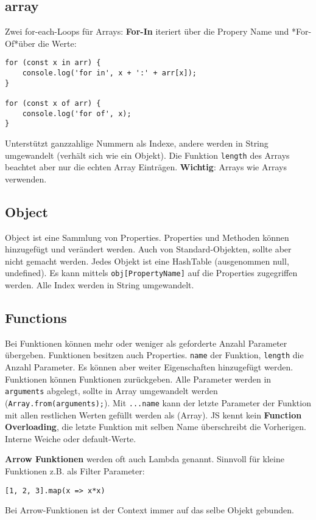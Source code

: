 \documentclass[11pt,twoside,landscape]{article}
\begin{document}
\begin{multicols}{4}
\subsection*{array}
\label{sec:org084a144}
Zwei for-each-Loops für Arrays: \textbf{For-In} iteriert über die Propery Name und *For-Of*über die Werte:
\begin{verbatim}
for (const x in arr) {
    console.log('for in', x + ':' + arr[x]);
}

for (const x of arr) {
    console.log('for of', x);
}
\end{verbatim}
Unterstützt ganzzahlige Nummern als Indexe, andere werden in String umgewandelt (verhält sich wie ein Objekt). Die Funktion \texttt{length} des Arrays beachtet aber nur die echten Array Einträgen. \textbf{Wichtig}: Arrays wie Arrays verwenden.

\subsection*{Object}
\label{sec:orgfeb8180}
Object ist eine Sammlung von Properties. Properties und Methoden können hinzugefügt und verändert werden. Auch von Standard-Objekten, sollte aber nicht gemacht werden. Jedes Objekt ist eine HashTable (ausgenommen null, undefined). Es kann mittels \texttt{obj[PropertyName]} auf die Properties zugegriffen werden. Alle Index werden in String umgewandelt.

\subsection*{Functions}
\label{sec:orgbafc31d}
Bei Funktionen können mehr oder weniger als geforderte Anzahl Parameter übergeben. Funktionen besitzen auch Properties. \texttt{name} der Funktion, \texttt{length} die Anzahl Parameter. Es können aber weiter Eigenschaften hinzugefügt werden. Funktionen können Funktionen zurückgeben. Alle Parameter werden in \texttt{arguments} abgelegt, sollte in Array umgewandelt werden (\texttt{Array.from(arguments);}). Mit \texttt{...name} kann der letzte Parameter der Funktion mit allen restlichen Werten gefüllt werden als (Array).
JS kennt kein \textbf{Function Overloading}, die letzte Funktion mit selben Name überschreibt die Vorherigen. Interne Weiche oder default-Werte.

\textbf{Arrow Funktionen} werden oft auch Lambda genannt. Sinnvoll für kleine Funktionen z.B. als Filter Parameter:
\begin{verbatim}
[1, 2, 3].map(x => x*x)
\end{verbatim}
Bei Arrow-Funktionen ist der Context immer auf das selbe Objekt gebunden.


\end{multicols}
\end{document}
